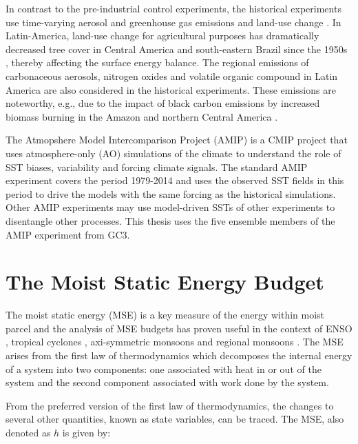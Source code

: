 In contrast to the pre-industrial control experiments, the historical experiments use  time-varying aerosol and greenhouse gas emissions and land-use change \citep{eyring2016}. In Latin-America, land-use change for agricultural purposes has dramatically decreased tree cover in Central America and south-eastern Brazil since the 1950s \citep{lawrence2012}, thereby affecting the surface energy balance. %
The regional emissions of carbonaceous aerosols, nitrogen oxides and volatile organic compound in Latin America are also considered in the historical experiments. These emissions are noteworthy, e.g., due to the impact of black carbon emissions by increased biomass burning in the Amazon and northern Central America \citep{chuvieco2008}.  


The Atmopshere Model Intercomparison Project (AMIP) is a CMIP project that uses atmosphere-only (AO) simulations of the climate to understand the role of SST biases, variability and forcing climate signals. The standard AMIP experiment covers the period 1979-2014 and uses the observed SST fields in this period to drive the models with the same forcing as the historical simulations. Other AMIP experiments may use model-driven SSTs of other experiments to disentangle other processes.  This thesis uses the five ensemble members of the AMIP experiment from GC3. 

\section{The Moist Static Energy Budget}\label{sq:msemethod}

The moist static energy (MSE) is a key measure of the energy within moist parcel and the analysis of MSE budgets has proven useful in the context of ENSO \citep[e.g.][]{annamalai2020}, tropical cyclones \citep[e.g.][]{wing2019}, axi-symmetric monsoons \citep[e.g.][]{bordoni2008} and regional monsoons \citep[e.g.][]{smyth2018simulated,ma2019}. The MSE arises from the first law of thermodynamics which decomposes the internal energy of a system into two components: one associated with heat in or out of the system and the second component associated with work done by the system. 

From the preferred version of the first law of thermodynamics, the changes to several other quantities, known as state variables, can be traced. 
The MSE, also denoted as $h$ is given by:

